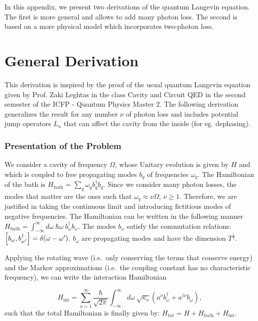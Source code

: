 In this appendix, we present two derivations of the quantum Langevin equation. The first is more general and allows to add many photon loss. The second is based on a more physical model which incorporates two-photon loss.

\section{General Derivation}
This derivation is inspired by the proof of the usual quantum Langevin equation given by Prof. Zaki Leghtas in the class Cavity and Circuit QED in the second semester of the ICFP - Quantum Physics Master 2. The following derivation generalizes the result for any number $\nu$ of photon loss and includes potential jump operators $L_n$ that can affect the cavity from the inside (for eg. dephasing).

\subsubsection{Presentation of the Problem}

We consider a cavity of frequency $\Omega$, whose Unitary evolution is given by $H$ and which is coupled to free propagating modes $b_q$ of frequencies $\omega_q$. The Hamiltonian of the bath is $H_{\text{bath}} = \sum_q \omega_q b^\dagger_q b_q$. Since we consider many photon losses, the modes that matter are the ones such that $\omega_q \approx \nu \Omega$, $\nu \ge 1$. Therefore, we are justified in taking the continuous limit and introducing fictitious modes of negative frequencies. The Hamiltonian can be written in the following manner $H_{\text{bath}} = \int_{-\infty}^\infty d\omega \ \hbar \omega \ b^\dagger_\omega b_\omega$. The modes $b_\omega$ satisfy the commutation relations: $\commutator{b_\omega}{b^\dagger_{\omega'}} = \delta(\omega - \omega')$. $b_\omega$ are propagating modes and have the dimension $T^{\frac{1}{2}}$.

Applying the rotating wave (i.e.\@~only conserving the terms that conserve energy) and the Markov approximations (i.e.\@~the coupling constant has no characteristic frequency), we can write the interaction Hamiltonian

\begin{equation}
    H_{\text{int}} = \sum_{\nu = 1}^\infty \frac{\hbar}{\sqrt{2 \pi}} \int_{-\infty}^\infty d\omega \ \sqrt{\kappa_\nu} \left(a^\nu b^\dagger_\omega + a^{\dagger \nu} b_\omega\right),
\end{equation}
such that the total Hamiltonian is finally given by: $H_{\text{tot}} = H + H_{\text{bath}} + H_{\text{int}}$.

